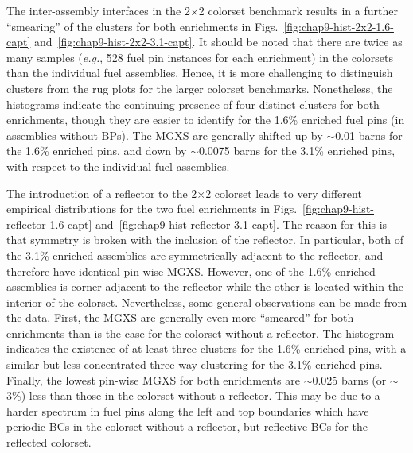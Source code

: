 The inter-assembly interfaces in the 2$\times$2 colorset benchmark results in a further ``smearing'' of the clusters for both enrichments in Figs.~\ref{fig:chap9-hist-2x2-1.6-capt} and~\ref{fig:chap9-hist-2x2-3.1-capt}. It should be noted that there are twice as many samples (\textit{e.g.}, 528 fuel pin instances for each enrichment) in the colorsets than the individual fuel assemblies. Hence, it is more challenging to distinguish clusters from the rug plots for the larger colorset benchmarks. Nonetheless, the histograms indicate the continuing presence of four distinct clusters for both enrichments, though they are easier to identify for the 1.6\% enriched fuel pins (in assemblies without \acp{BP}). The \ac{MGXS} are generally shifted up by $\sim$0.01 barns for the 1.6\% enriched pins, and down by $\sim$0.0075 barns for the 3.1\% enriched pins, with respect to the individual fuel assemblies.

The introduction of a reflector to the 2$\times$2 colorset leads to very different empirical distributions for the two fuel enrichments in Figs.~\ref{fig:chap9-hist-reflector-1.6-capt} and~\ref{fig:chap9-hist-reflector-3.1-capt}. The reason for this is that symmetry is broken with the inclusion of the reflector. In particular, both of the 3.1\% enriched assemblies are symmetrically adjacent to the reflector, and therefore have identical pin-wise \ac{MGXS}. However, one of the 1.6\% enriched assemblies is corner adjacent to the reflector while the other is located within the interior of the colorset. Nevertheless, some general observations can be made from the data. First, the \ac{MGXS} are generally even more ``smeared'' for both enrichments than is the case for the colorset without a reflector. The histogram indicates the existence of at least three clusters for the 1.6\% enriched pins, with a similar but less concentrated three-way clustering for the 3.1\% enriched pins. Finally, the lowest pin-wise \ac{MGXS} for both enrichments are $\sim$0.025 barns (or $\sim$3\%) less than those in the colorset without a reflector. This may be due to a harder spectrum in fuel pins along the left and top boundaries which have periodic \acp{BC} in the colorset without a reflector, but reflective \acp{BC} for the reflected colorset.


